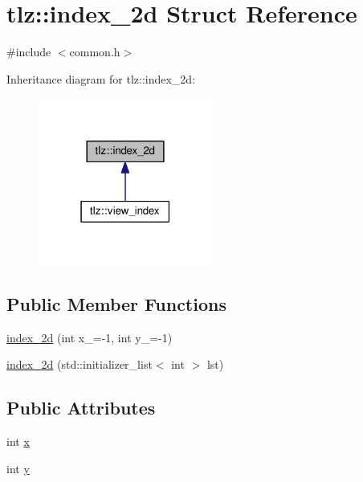 \hypertarget{structtlz_1_1index__2d}{}\section{tlz\+:\+:index\+\_\+2d Struct Reference}
\label{structtlz_1_1index__2d}


{\ttfamily \#include $<$common.\+h$>$}



Inheritance diagram for tlz\+:\+:index\+\_\+2d\+:
\nopagebreak
\begin{figure}[H]
\begin{center}
\leavevmode
\includegraphics[width=162pt]{structtlz_1_1index__2d__inherit__graph}
\end{center}
\end{figure}
\subsection*{Public Member Functions}
\begin{DoxyCompactItemize}
\item 
\hyperlink{structtlz_1_1index__2d_ab4384fd47c3b5da797d795433ce623da}{index\+\_\+2d} (int x\+\_\+=-\/1, int y\+\_\+=-\/1)
\item 
\hyperlink{structtlz_1_1index__2d_a1e8ed61cdcfce7fb5cbe6e54f1eab91d}{index\+\_\+2d} (std\+::initializer\+\_\+list$<$ int $>$ lst)
\end{DoxyCompactItemize}
\subsection*{Public Attributes}
\begin{DoxyCompactItemize}
\item 
int \hyperlink{structtlz_1_1index__2d_a1035763bee547dacf5abf62030ba0294}{x}
\item 
int \hyperlink{structtlz_1_1index__2d_a1e7f4d031e279cff0cc45fc09cd2d501}{y}
\end{DoxyCompactItemize}


